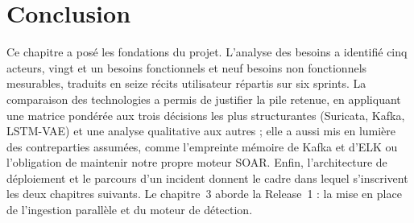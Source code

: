 \section{Conclusion}

Ce chapitre a posé les fondations du projet. L'analyse des besoins a identifié cinq acteurs, vingt et un besoins fonctionnels et neuf besoins non fonctionnels mesurables, traduits en seize récits utilisateur répartis sur six sprints. La comparaison des technologies a permis de justifier la pile retenue, en appliquant une matrice pondérée aux trois décisions les plus structurantes (Suricata, Kafka, LSTM-VAE) et une analyse qualitative aux autres ; elle a aussi mis en lumière des contreparties assumées, comme l'empreinte mémoire de Kafka et d'ELK ou l'obligation de maintenir notre propre moteur SOAR. Enfin, l'architecture de déploiement et le parcours d'un incident donnent le cadre dans lequel s'inscrivent les deux chapitres suivants. Le chapitre~3 aborde la Release~1 : la mise en place de l'ingestion parallèle et du moteur de détection.